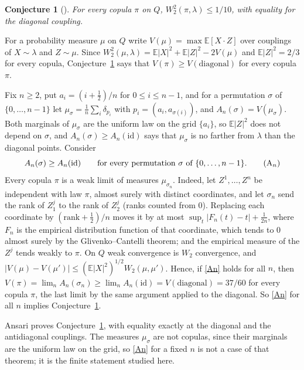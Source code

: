 \documentclass[11pt]{amsart}
\newtheorem{conjecture}[theorem]{Conjecture}
\theoremstyle{definition}
\theoremstyle{remark}
\numberwithin{equation}{section}
\newcommand{\E}{\mathbb{E}}
\begin{document}
\begin{conjecture}[{\cite[Remark~3]{CL}}]\label{conj}
For every copula $\pi$ on $Q$, $W_2^2(\pi,\lambda)\le 1/10$, with equality for the diagonal coupling.
\end{conjecture}

For a probability measure $\mu$ on $Q$ write $V(\mu)=\max\E[X\cdot Z]$ over couplings of $X\sim\lambda$ and $Z\sim\mu$.
Since $W_2^2(\mu,\lambda)=\E|X|^2+\E|Z|^2-2V(\mu)$ and $\E|Z|^2=2/3$ for every copula, Conjecture~\ref{conj} says that
$V(\pi)\ge V(\text{diagonal})$ for every copula $\pi$.

Fix $n\ge 2$, put $a_i=(i+\frac12)/n$ for $0\le i\le n-1$, and for a permutation $\sigma$ of $\{0,\dots,n-1\}$ let
$\mu_\sigma=\frac1n\sum_i\delta_{p_i}$ with $p_i=(a_i,a_{\sigma(i)})$, and $A_n(\sigma)=V(\mu_\sigma)$. Both marginals of
$\mu_\sigma$ are the uniform law on the grid $\{a_i\}$, so $\E|Z|^2$ does not depend on $\sigma$, and
$A_n(\sigma)\ge A_n(\mathrm{id})$ says that $\mu_\sigma$ is no farther from $\lambda$ than the diagonal points. Consider
\begin{equation}\label{An}
A_n(\sigma)\ge A_n(\mathrm{id})\qquad\text{for every permutation }\sigma\text{ of }\{0,\dots,n-1\}.
\tag{$\mathrm{A}_n$}
\end{equation}
Every copula $\pi$ is a weak limit of measures $\mu_{\sigma_n}$. Indeed, let $Z^1,\dots,Z^n$ be independent with law
$\pi$, almost surely with distinct coordinates, and let $\sigma_n$ send the rank of $Z^j_1$ to the rank of $Z^j_2$
(ranks counted from $0$). Replacing each coordinate by $(\text{rank}+\frac12)/n$ moves it by at most
$\sup_t|F_n(t)-t|+\frac1{2n}$, where $F_n$ is the empirical distribution function of that coordinate, which tends to $0$
almost surely by the Glivenko--Cantelli theorem; and the empirical measure of the $Z^j$ tends weakly to $\pi$. On $Q$
weak convergence is $W_2$ convergence, and $|V(\mu)-V(\mu')|\le(\E|X|^2)^{1/2}W_2(\mu,\mu')$. Hence, if \eqref{An} holds
for all $n$, then $V(\pi)=\lim_n A_n(\sigma_n)\ge\lim_n A_n(\mathrm{id})=V(\text{diagonal})=37/60$ for every copula
$\pi$, the last limit by the same argument applied to the diagonal. So \eqref{An} for all $n$ implies
Conjecture~\ref{conj}.

Ansari \cite{Ansari} proves Conjecture~\ref{conj}, with equality exactly at the diagonal and the antidiagonal
couplings. The measures $\mu_\sigma$ are not copulas, since their marginals are the uniform law on the grid, so
\eqref{An} for a fixed $n$ is not a case of that theorem; it is the finite statement studied here.
\end{document}
